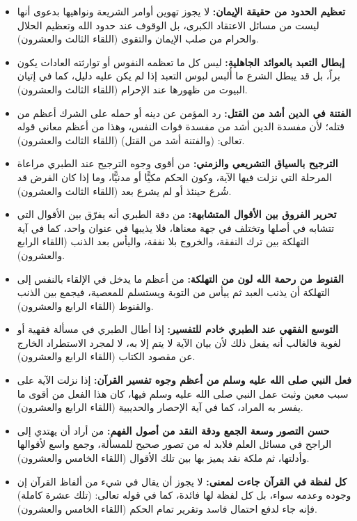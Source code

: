 \begin{itemize}
    \item \textbf{تعظيم الحدود من حقيقة الإيمان:} لا يجوز تهوين أوامر الشريعة ونواهيها بدعوى أنها ليست من مسائل الاعتقاد الكبرى، بل الوقوف عند حدود الله وتعظيم الحلال والحرام من صلب الإيمان والتقوى (اللقاء الثالث والعشرون).
    \item \textbf{إبطال التعبد بالعوائد الجاهلية:} ليس كل ما تعظمه النفوس أو توارثته العادات يكون براً، بل قد يبطل الشرع ما أُلبس لبوس التعبد إذا لم يكن عليه دليل، كما في إتيان البيوت من ظهورها عند الإحرام (اللقاء الثالث والعشرون).
    \item \textbf{الفتنة في الدين أشد من القتل:} رد المؤمن عن دينه أو حمله على الشرك أعظم من قتله؛ لأن مفسدة الدين أشد من مفسدة فوات النفس، وهذا من أعظم معاني قوله تعالى: (والفتنة أشد من القتل) (اللقاء الثالث والعشرون).
    \item \textbf{الترجيح بالسياق التشريعي والزمني:} من أقوى وجوه الترجيح عند الطبري مراعاة المرحلة التي نزلت فيها الآية، وكون الحكم مكيًّا أو مدنيًّا، وما إذا كان الفرض قد شُرع حينئذ أو لم يشرع بعد (اللقاء الثالث والعشرون).
    \item \textbf{تحرير الفروق بين الأقوال المتشابهة:} من دقة الطبري أنه يفرّق بين الأقوال التي تتشابه في أصلها وتختلف في جهة معناها، فلا يذيبها في عنوان واحد، كما في آية التهلكة بين ترك النفقة، والخروج بلا نفقة، واليأس بعد الذنب (اللقاء الرابع والعشرون).
    \item \textbf{القنوط من رحمة الله لون من التهلكة:} من أعظم ما يدخل في الإلقاء بالنفس إلى التهلكة أن يذنب العبد ثم ييأس من التوبة ويستسلم للمعصية، فيجمع بين الذنب والقنوط (اللقاء الرابع والعشرون).
    \item \textbf{التوسع الفقهي عند الطبري خادم للتفسير:} إذا أطال الطبري في مسألة فقهية أو لغوية فالغالب أنه يفعل ذلك لأن بيان الآية لا يتم إلا به، لا لمجرد الاستطراد الخارج عن مقصود الكتاب (اللقاء الرابع والعشرون).
    \item \textbf{فعل النبي صلى الله عليه وسلم من أعظم وجوه تفسير القرآن:} إذا نزلت الآية على سبب معين وثبت عمل النبي صلى الله عليه وسلم فيها، كان هذا الفعل من أقوى ما يفسر به المراد، كما في آية الإحصار والحديبية (اللقاء الرابع والعشرون).
    \item \textbf{حسن التصور وسعة الجمع ودقة النقد من أصول الفهم:} من أراد أن يهتدي إلى الراجح في مسائل العلم فلابد له من تصور صحيح للمسألة، وجمع واسع لأقوالها وأدلتها، ثم ملكة نقد يميز بها بين تلك الأقوال (اللقاء الخامس والعشرون).
    \item \textbf{كل لفظة في القرآن جاءت لمعنى:} لا يجوز أن يقال في شيء من ألفاظ القرآن إن وجوده وعدمه سواء، بل كل لفظة لها فائدة، كما في قوله تعالى: (تلك عشرة كاملة) فإنه جاء لدفع احتمال فاسد وتقرير تمام الحكم (اللقاء الخامس والعشرون).

\end{itemize}
